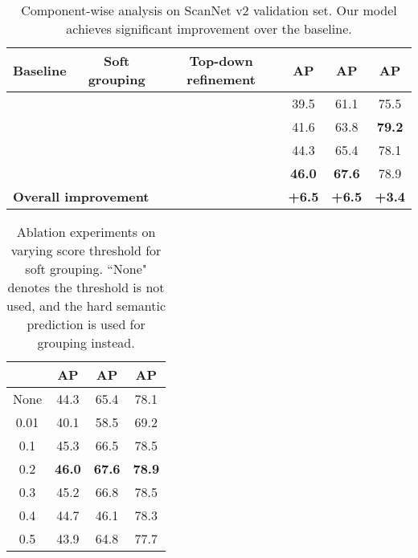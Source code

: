 \documentclass[10pt,twocolumn,letterpaper]{article}
\begin{document}
	\begin{table}[]
		\small
		\centering
		\setlength{\tabcolsep}{2.3pt}
		\begin{tabular}{@{}cccccc@{}}
			\toprule
			Baseline & Soft grouping & Top-down refinement & AP   & AP & AP \\ \midrule
			\checkmark        &               &                 & 39.5 & 61.1 & 75.5 \\
			& \checkmark             &                 & 41.6 & 63.8 & \textbf{79.2} \\
			&               & \checkmark               & 44.3 & 65.4 & 78.1 \\
			& \checkmark             & \checkmark               & \textbf{46.0}   & \textbf{67.6} & 78.9 \\ \midrule
			\multicolumn{3}{l}{\textbf{Overall improvement}} & \textbf{+6.5} & \textbf{+6.5} & \textbf{+3.4} \\ \bottomrule
		\end{tabular}
		\caption{Component-wise analysis on ScanNet v2 validation set. Our model achieves significant improvement over the baseline. }
		\label{tab:component_analysis}
	\end{table}
	
	\begin{table}[]
		\centering
		\setlength{\tabcolsep}{12pt}
		\begin{tabular}{c|ccc}
			\toprule
			  & AP            & AP & AP        \\ \midrule
			None & 44.3          & 65.4          & 78.1          \\ \midrule
			0.01 & 40.1          & 58.5          & 69.2          \\
			0.1  & 45.3          & 66.5          & 78.5          \\
			0.2  & \textbf{46.0} & \textbf{67.6} & \textbf{78.9} \\
			0.3  & 45.2          & 66.8          & 78.5          \\
			0.4  & 44.7          & 46.1          & 78.3          \\
			0.5  & 43.9          & 64.8          & 77.7          \\ \bottomrule
		\end{tabular}
		\caption{Ablation experiments on varying score threshold  for soft grouping. ``None" denotes the threshold is not used, and the hard semantic prediction is used for grouping instead.}
		\label{tab:score_thr}
	\end{table}
	
\end{document}
